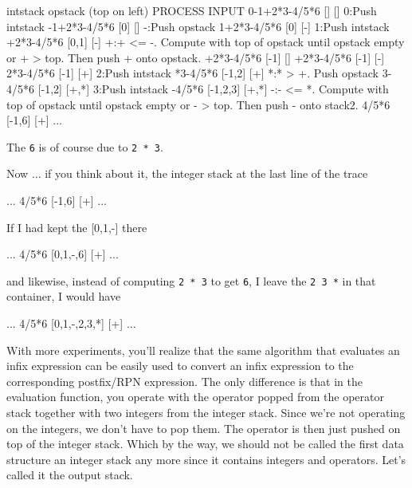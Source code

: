 {\scriptsize
\begin{console}
              intstack opstack (top on left)
                              PROCESS INPUT
0-1+2*3-4/5*6 []       []
                              0:Push intstack
 -1+2*3-4/5*6 [0]      []
                              -:Push opstack
  1+2*3-4/5*6 [0]      [-]
                              1:Push intstack
   +2*3-4/5*6 [0,1]    [-]
                              +:+ <= -. Compute with top of
                                opstack until opstack empty or
                                + > top.
                                Then push + onto opstack.
   +2*3-4/5*6 [-1]     []
   +2*3-4/5*6 [-1]     [-]
    2*3-4/5*6 [-1]     [+]
                              2:Push intstack
     *3-4/5*6 [-1,2]   [+]
                              *:* > +. Push opstack
      3-4/5*6 [-1,2]   [+,*]
                              3:Push intstack
       -4/5*6 [-1,2,3] [+,*]
                              -:- <= *. Compute with top of
                                opstack until opstack empty or
                                - > top.
                                Then push - onto stack2.
        4/5*6 [-1,6]   [+]
...
\end{console}
}
The \texttt{6} is of course due to \texttt{2 * 3}.

Now ... if you think about it, the integer stack at the last line of the trace
{\scriptsize
\begin{console}
...
        4/5*6 [-1,6]   [+]
...
\end{console}
}
If I had kept the [0,1,-] there
{\scriptsize
\begin{console}
...
        4/5*6 [0,1,-,6]   [+]
...
\end{console}
}
and likewise, instead of computing \texttt{2 * 3} to get \texttt{6},
I leave the \texttt{2 3 *} in that container, I would have
{\scriptsize
\begin{console}
...
        4/5*6 [0,1,-,2,3,*]   [+]
...
\end{console}
}

With more experiments, you'll realize that
the same algorithm that evaluates
an infix expression can be easily used to convert
an infix expression to the corresponding postfix/RPN expression.
The only difference is that in the evaluation function,
you operate with the operator popped from the operator stack
together with two integers from the integer stack.
Since we're not operating on the integers,
we don't have to pop them.
The operator is then just pushed on top of the
integer stack.
Which by the way, we should not be called the first
data structure an integer stack any more
since it contains integers and operators.
Let's called it the output stack.

